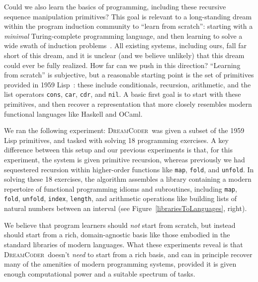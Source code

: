 \documentclass{article}
\newcommand{\system}{\textsc{DreamCoder}~}
\newcommand{\code}[1]{{\footnotesize\texttt{#1}}}
\begin{document}
Could we also learn the basics of programming, including these recursive sequence manipulation primitives?
This goal is relevant to a long-standing dream within the program induction community to ``learn from scratch'': starting with a \emph{minimal} Turing-complete programming language,
and then learning to solve a wide swath of
induction problems~\cite{solomonoff1964formal,schmidhuber2004optimal,hutter2004universal,solomonoff1989system}.
All existing systems,
including ours,
fall far short of this dream,
and it is unclear (and we believe unlikely)
that this dream could ever be fully realized.
How far can we push in this direction?
``Learning from scratch'' is subjective, but a reasonable
starting point is the set of primitives provided in 1959
Lisp~\cite{mccarthy1960recursive}: these include
conditionals, recursion, arithmetic, and the 
list operators \code{cons}, \code{car}, \code{cdr}, and \code{nil}.
A  basic first goal is to start with
these primitives,
and then recover a representation that
more closely resembles modern functional languages like Haskell and OCaml.

We ran the following experiment: \system was given a subset of the
1959 Lisp primitives, and tasked with solving 18 programming
exercises. A key difference between this setup and our previous
experiments is that, for this experiment, the system is given
primitive recursion, whereas previously we had sequestered recursion
within higher-order functions like \code{map}, \code{fold}, and
\code{unfold}.  In solving these 18 exercises, the algorithm assembles
a library containing a modern repertoire of functional programming idioms
and subroutines, including \code{map}, \code{fold}, \code{unfold},
\code{index}, \code{length}, and arithmetic operations like building
lists of natural numbers between an interval (see
Figure~\ref{librariesToLanguages}, right).

We believe that program learners should \emph{not}
start from scratch,
but instead should start from
a rich, domain-agnostic
basis like those embodied in the standard libraries of modern  languages.
What these experiments reveal is that \system doesn't \emph{need} to start from a rich basis,
and can in principle recover many of the amenities of modern programming systems,
provided it is given enough computational power and a suitable
spectrum of tasks.
\end{document}
